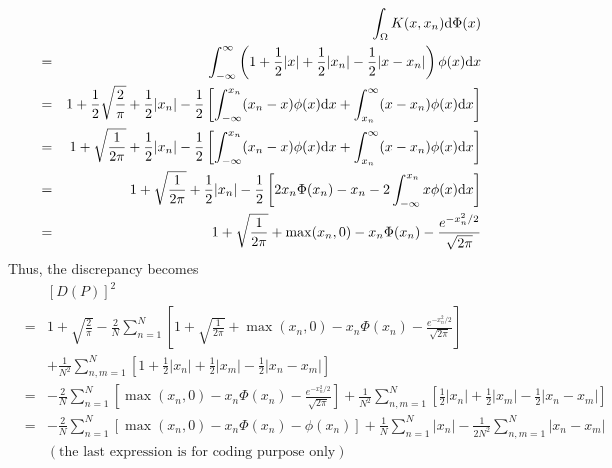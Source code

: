 \documentclass[12pt]{article}
\newcommand{\dif}{{\rm d}}
\begin{document}
\begin{enumerate}
    
    \begin{eqnarray*}
  &&  \int_{\Omega}K(x,x_n)\dif \Phi(x)\\
    &=& \int_{-\infty}^{\infty} \left(1+\frac{1}{2}|x|+\frac{1}{2}|x_n|-\frac{1}{2}|x-x_n|\right)\phi(x)\dif x\\
    &=& 1+\frac{1}{2}\sqrt{\frac{2}{\pi}}+\frac{1}{2}|x_n|-\frac{1}{2}\left[\int_{-\infty}^{x_n}(x_n-x)\phi(x)\dif x+\int_{x_n}^{\infty} (x-x_n)\phi(x)\dif x\right]\\
    &=& 1+\sqrt{\frac{1}{2\pi}}+\frac{1}{2}|x_n|-\frac{1}{2}\left[\int_{-\infty}^{x_n}(x_n-x)\phi(x)\dif x+\int_{x_n}^{\infty} (x-x_n)\phi(x)\dif x\right]\\
    &=& 1+\sqrt{\frac{1}{2\pi}}+\frac{1}{2}|x_n|-\frac{1}{2}\left[2x_n\Phi(x_n)-x_n-2\int_{-\infty}^{x_n}x\phi(x)\dif x\right]\\
    &=& 1+\sqrt{\frac{1}{2\pi}}+\max(x_n,0)-x_n\Phi(x_n)-\frac{ e^{-x_n^2/2}}{\sqrt{2\pi}}
    \end{eqnarray*}
    Thus, the discrepancy becomes
    \begin{eqnarray*}
   && [D(P)]^2\\
    &= &1+\sqrt{\frac{2}{\pi}}-\frac{2}{N}\sum_{n=1}^N \left[1+\sqrt{\frac{1}{2\pi}}+\max(x_n,0)-x_n\Phi(x_n)-\frac{ e^{-x_n^2/2}}{\sqrt{2\pi}}\right]\\
    &&+\frac{1}{N^2}\sum_{n,m=1}^N \left[1+\frac{1}{2}|x_n|+\frac{1}{2}|x_m|-\frac{1}{2}|x_n-x_m|\right]\\
     &= &-\frac{2}{N}\sum_{n=1}^N \left[\max(x_n,0)-x_n\Phi(x_n)-\frac{ e^{-x_n^2/2}}{\sqrt{2\pi}}\right]+\frac{1}{N^2}\sum_{n,m=1}^N \left[\frac{1}{2}|x_n|+\frac{1}{2}|x_m|-\frac{1}{2}|x_n-x_m|\right]\\
     &=& -\frac{2}{N}\sum_{n=1}^N \left[\max(x_n,0)-x_n\Phi(x_n)-\phi(x_n)\right]+\frac{1}{N}\sum_{n=1}^N|x_n|-\frac{1}{2N^2}\sum_{n,m=1}^N|x_n-x_m|\\ &&(\text{the last expression is for coding purpose only})
    \end{eqnarray*}
    

\end{enumerate}
\end{document}
